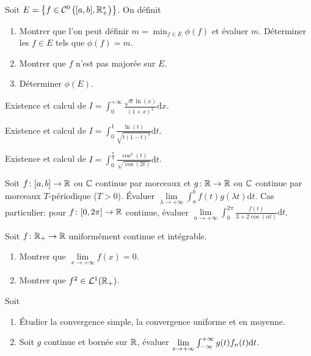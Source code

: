 \begin{exercise}
    Soit $E=\left\lbrace f\in\mathcal{C}^{0}\left([a,b],\mathbb{R}_{+}^{*}\right)\right\rbrace$. On définit 
    \begin{enumerate}
        \item Montrer que l'on peut définir $m=\min_{f\in E}\phi(f)$ et évaluer $m$. Déterminer les $f\in E$ tels que $\phi(f)=m$.
        \item Montrer que $f$ n'est pas majorée sur $E$.
        \item Déterminer $\phi(E)$.
    \end{enumerate}
\end{exercise}

\begin{exercise}
    Existence et calcul de $I=\int_{0}^{+\infty}\frac{\sqrt{x}\ln(x)}{(1+x)^{2}}\mathrm{d}x$.
\end{exercise}

\begin{exercise}
    Existence et calcul de $I=\int_{0}^{1}\frac{\ln(t)}{\sqrt{t(1-t)^{3}}}\mathrm{d}t$.
\end{exercise}

\begin{exercise}
    Existence et calcul de $I=\int_{0}^{\frac{\pi}{4}}\frac{\cos^{3}(t)}{\sqrt{\cos(2t)}}\mathrm{d}t$.
\end{exercise}

\begin{exercise}
    Soit $f\colon[a,b]\to\mathbb{R}$ ou $\mathbb{C}$ continue par morceaux et $g\colon\mathbb{R}\to\mathbb{R}$ ou $\mathbb{C}$ continue par morceaux $T$-périodique ($T>0$). Évaluer $\lim\limits_{\lambda\to+\infty}\int_{a}^{b}f(t)g(\lambda t)\mathrm{d}t$. Cas particulier: pour $f\colon[0,2\pi]\to\mathbb{R}$ continue, évaluer $\lim\limits_{n\to+\infty}\int_{0}^{2\pi}\frac{f(t)}{3+2\cos(nt)}\mathrm{d}t$.
\end{exercise}

\begin{exercise}
    Soit $f\colon\mathbb{R}_{+}\to\mathbb{R}$ uniformément continue et intégrable.
    \begin{enumerate}
        \item Montrer que $\lim\limits_{x\to+\infty}f(x)=0$.
        \item Montrer que $f^{2}\in\mathcal{L}^{1}(\mathbb{R}_{+})$.
    \end{enumerate}
\end{exercise}

\begin{exercise}
    Soit 
    \begin{enumerate}
        \item Étudier la convergence simple, la convergence uniforme et en moyenne.
        \item Soit $g$ continue et bornée sur $\mathbb{R}$, évaluer $\lim\limits_{x\to+\infty}\int_{-\infty}^{+\infty}g(t)f_n(t)\mathrm{d} t$.
    \end{enumerate}
\end{exercise}

